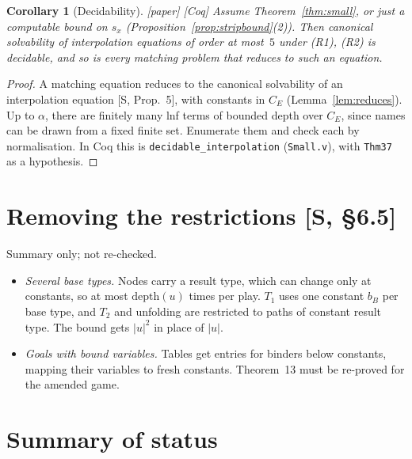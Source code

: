\documentclass[11pt]{article}
\newcommand{\depth}{\mathrm{depth}}
\newcommand{\CE}{C_E}
\newcommand{\Paper}{\textsf{[paper]}}
\newcommand{\Coq}{\textsf{[Coq]}}
\theoremstyle{plain}
\newtheorem{corollary}[theorem]{Corollary}
\theoremstyle{definition}
\theoremstyle{remark}
\begin{document}
\begin{corollary}[Decidability]\label{cor:decidable}
\Paper{} \Coq{} Assume Theorem~\ref{thm:small}, or just a computable
bound on $s_x$ (Proposition~\ref{prop:stripbound}(2)).  Then canonical
solvability of interpolation equations of order at most~$5$ under (R1),
(R2) is decidable, and so is every matching problem that reduces to
such an equation.
\end{corollary}
\begin{proof}
A matching equation reduces to the canonical solvability of an
interpolation equation [S, Prop.~5], with constants in $\CE$
(Lemma~\ref{lem:reduces}).  Up to $\alpha$, there are finitely many lnf
terms of bounded depth over $\CE$, since names can be drawn from a
fixed finite set.  Enumerate them and check each by normalisation.  In
Coq this is \texttt{decidable\_interpolation} (\texttt{Small.v}), with
\texttt{Thm37} as a hypothesis.
\end{proof}

\section{Removing the restrictions [S, \S6.5]}\label{sec:restrictions}

Summary only; not re-checked.
\begin{itemize}
\item \emph{Several base types.} Nodes carry a result type, which can
  change only at constants, so at most $\depth(u)$ times per play.
  $T_1$ uses one constant $b_B$ per base type, and $T_2$ and unfolding
  are restricted to paths of constant result type.  The bound gets
  $|u|^2$ in place of $|u|$.
\item \emph{Goals with bound variables.} Tables get entries for binders
  below constants, mapping their variables to fresh constants.  Theorem~13
  must be re-proved for the amended game.
\end{itemize}

\section{Summary of status}\label{sec:summary}
\end{document}
